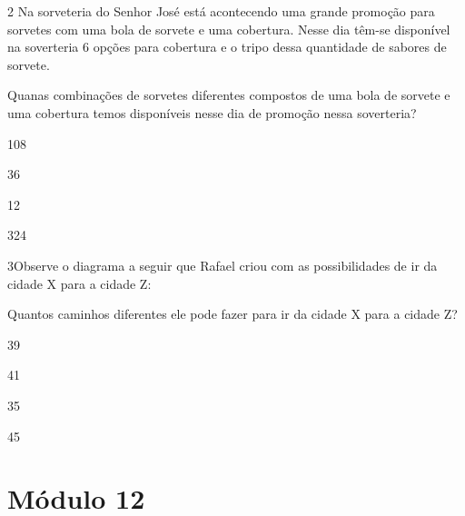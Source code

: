 
\num{2} Na sorveteria do Senhor José está acontecendo uma grande promoção
para sorvetes com uma bola de sorvete e uma cobertura. Nesse dia têm-se
disponível na soverteria 6 opções para cobertura e o tripo dessa
quantidade de sabores de sorvete.

Quanas combinações de sorvetes diferentes compostos de uma bola de
sorvete e uma cobertura temos disponíveis nesse dia de promoção nessa
soverteria?

\begin{escolha}
\item
  108
\item
  36
\item
  12
\item
  324
\end{escolha}


\num{3}Observe o diagrama a seguir que Rafael criou com as possibilidades
de ir da cidade X para a cidade Z:

%

Quantos caminhos diferentes ele pode fazer para ir da cidade X para a
cidade Z?

\begin{escolha}
\item
  39
\item
  41
\item
  35
\item
  45
\end{escolha}


\chapter{Módulo 12}


